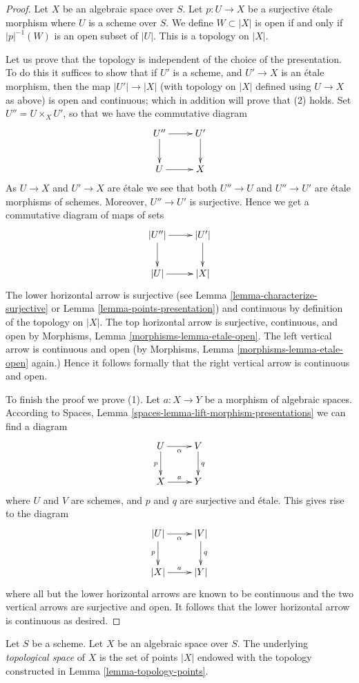 \begin{proof}
Let $X$ be an algebraic space over $S$. Let $p : U \to X$ be a
surjective \'etale morphism where $U$ is a scheme over $S$.
We define $W \subset |X|$ is open if and only if $|p|^{-1}(W)$
is an open subset of $|U|$. This is a topology on $|X|$.

\medskip\noindent
Let us prove that the topology is independent of the choice of
the presentation. To do this it suffices to show that if $U'$ is a scheme,
and $U' \to X$ is an \'etale morphism, then the map $|U'| \to |X|$
(with topology on $|X|$ defined using $U \to X$ as above)
is open and continuous; which in addition will prove that (2) holds.
Set $U'' = U \times_X U'$, so that we have the commutative diagram
$$
\xymatrix{
U'' \ar[r] \ar[d] & U' \ar[d] \\
U \ar[r] & X
}
$$
As $U \to X$ and $U' \to X$ are \'etale we see that
both $U'' \to U$ and $U'' \to U'$ are \'etale morphisms of schemes.
Moreover, $U'' \to U'$ is surjective. Hence
we get a commutative diagram of maps of sets
$$
\xymatrix{
|U''| \ar[r] \ar[d] & |U'| \ar[d] \\
|U| \ar[r] & |X|
}
$$
The lower horizontal arrow is surjective (see
Lemma \ref{lemma-characterize-surjective}
or
Lemma \ref{lemma-points-presentation})
and continuous by definition of the topology on $|X|$.
The top horizontal arrow is surjective, continuous, and open by
Morphisms, Lemma \ref{morphisms-lemma-etale-open}.
The left vertical arrow is continuous and open (by
Morphisms, Lemma \ref{morphisms-lemma-etale-open}
again.) Hence it follows formally that the right vertical
arrow is continuous and open.

\medskip\noindent
To finish the proof we prove (1).
Let $a : X \to Y$ be a morphism of algebraic spaces. According to
Spaces, Lemma \ref{spaces-lemma-lift-morphism-presentations}
we can find a diagram
$$
\xymatrix{
U \ar[d]_p \ar[r]_\alpha & V \ar[d]^q \\
X \ar[r]^a & Y
}
$$
where $U$ and $V$ are schemes, and $p$ and $q$ are surjective and \'etale.
This gives rise to the diagram
$$
\xymatrix{
|U| \ar[d]_p \ar[r]_\alpha & |V| \ar[d]^q \\
|X| \ar[r]^a & |Y|
}
$$
where all but the lower horizontal arrows are known to be continuous and
the two vertical arrows are surjective and open. It follows that the
lower horizontal arrow is continuous as desired.
\end{proof}

\begin{definition}
\label{definition-topological-space}
Let $S$ be a scheme. Let $X$ be an algebraic space over $S$.
The underlying {\it topological space} of $X$ is the set of points
$|X|$ endowed with the topology constructed in
Lemma \ref{lemma-topology-points}.
\end{definition}

